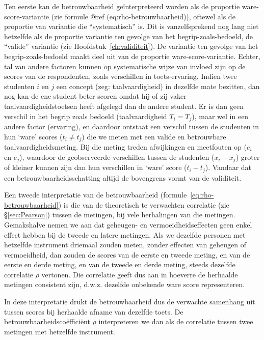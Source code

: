 \documentclass[
]{book}
\begin{document}
Ten eerste kan de betrouwbaarheid geïnterpreteerd worden als de
proportie ware-score-variantie (zie formule @ref (eq:rho-betrouwbaarheid)),
oftewel als de proportie van
variantie die ``systematisch'' is. Dit is vanzelfsprekend nog lang niet
hetzelfde als de proportie variantie ten gevolge van het
begrip-zoals-bedoeld, de ``valide'' variantie (zie
Hoofdstuk~\ref{ch:validiteit}). De variantie ten gevolge van het
begrip-zoals-bedoeld maakt deel uit van de proportie
ware-score-variantie. Echter, tal van andere factoren kunnen op
systematische wijze van invloed zijn op de scores van de respondenten,
zoals verschillen in toets-ervaring. Indien twee studenten \(i\) en \(j\)
een concept (zeg: taalvaardigheid) in dezelfde mate bezitten, dan nog
kan de ene student beter scoren omdat hij of zij vaker
taalvaardigheidstoetsen heeft afgelegd dan de andere student. Er is dan
geen verschil in het begrip zoals bedoeld (taalvaardigheid \(T_i = T_j\)),
maar wel in een andere factor (ervaring), en daardoor ontstaat een
verschil tussen de studenten in hun `ware' scores (\(t_i \neq t_j\)) die
we meten met een valide en betrouwbare taalvaardigheidsmeting. Bij die
meting treden afwijkingen en meetfouten op (\(e_i\) en \(e_j\)), waardoor de
geobserveerde verschillen tussen de studenten (\(x_i-x_j\)) groter of
kleiner kunnen zijn dan hun verschillen in `ware' score (\(t_i-t_j\)).
Vandaar dat een betrouwbaarheidsschatting altijd de bovengrens vormt van
de validiteit.

Een tweede interpretatie van de betrouwbaarheid (formule~\eqref{eq:rho-betrouwbaarheid})
is die van de theoretisch te verwachten correlatie (zie
§\ref{sec:Pearson}) tussen de metingen, bij vele herhalingen van
die metingen. Gemakshalve nemen we aan dat geheugen- en
vermoeidheidseffecten geen enkel effect hebben bij de tweede en latere
metingen. Als we dezelfde personen met hetzelfde instrument driemaal
zouden meten, zonder effecten van geheugen of vermoeidheid, dan zouden
de scores van de eerste en tweede meting, en van de eerste en derde
meting, en van de tweede en derde meting, steeds dezelfde correlatie
\(\rho\) vertonen. Die correlatie geeft dus aan in hoeverre de herhaalde
metingen consistent zijn, d.w.z. dezelfde onbekende ware score
representeren.

In deze interpretatie drukt de betrouwbaarheid dus de verwachte
samenhang uit tussen scores bij herhaalde afname van dezelfde toets. De
betrouwbaarheidscoëfficiënt \(\rho\) interpreteren we dan als de
correlatie tussen twee metingen met hetzelfde instrument.
\end{document}

